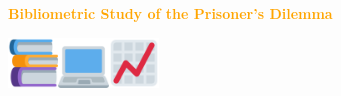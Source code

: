 \documentclass{beamer}
\begin{document}
\begin{frame}
    \begin{center}
    \textcolor{orange}{\large{\textbf{Bibliometric Study of the Prisoner's Dilemma}}} \vspace{1cm}
    
    \includegraphics[width=0.10\textwidth]{static/books.png}\hspace{2pt}\includegraphics[width=0.10\textwidth]{static/pc.png}\hspace{2pt}\includegraphics[width=0.10\textwidth]{static/chart.png}
    \end{center}
\end{frame}

\begin{frame}
    \begin{center}
    
    \end{center}
\end{frame}

\begin{frame}
    \begin{center}
    
    \end{center}
\end{frame}

\begin{frame}
    \begin{center}
    
    \end{center}
\end{frame}

\begin{frame}
    \begin{center}
    
    \end{center}
\end{frame}
\end{document}
